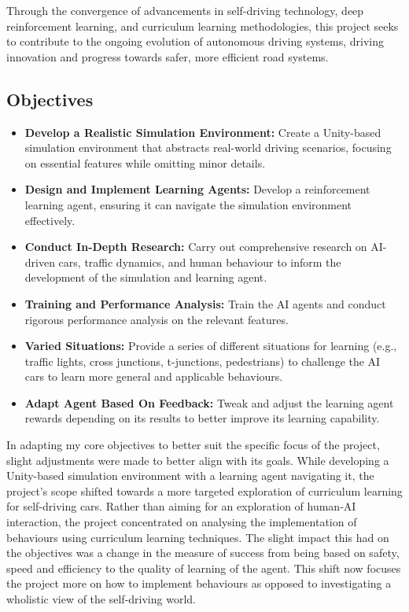 \documentclass{article}
\begin{document}
Through the convergence of advancements in self-driving technology, deep reinforcement learning, and curriculum learning methodologies, this project seeks to contribute to the ongoing evolution of autonomous driving systems, driving innovation and progress towards safer, more efficient road systems.

\subsection{Objectives}
\begin{itemize}
    \item \textbf{Develop a Realistic Simulation Environment:} Create a Unity-based simulation environment that abstracts real-world driving scenarios, focusing on essential features while omitting minor details.
    
    \item \textbf{Design and Implement Learning Agents:} Develop a reinforcement learning agent, ensuring it can navigate the simulation environment effectively.
    
    \item \textbf{Conduct In-Depth Research:} Carry out comprehensive research on AI-driven cars, traffic dynamics, and human behaviour to inform the development of the simulation and learning agent.
    
    \item \textbf{Training and Performance Analysis:} Train the AI agents and conduct rigorous performance analysis on the relevant features.
    
    \item \textbf{Varied Situations:} Provide a series of different situations for learning (e.g., traffic lights, cross junctions, t-junctions, pedestrians) to challenge the AI cars to learn more general and applicable behaviours.
    
    \item \textbf{Adapt Agent Based On Feedback:} Tweak and adjust the learning agent rewards depending on its results to better improve its learning capability.
    
\end{itemize}

In adapting my core objectives to better suit the specific focus of the project, slight adjustments were made to better align with its goals. While developing a Unity-based simulation environment with a learning agent navigating it, the project's scope shifted towards a more targeted exploration of curriculum learning for self-driving cars. Rather than aiming for an exploration of human-AI interaction, the project concentrated on analysing the implementation of behaviours using curriculum learning techniques. The slight impact this had on the objectives was a change in the measure of success from being based on safety, speed and efficiency to the quality of learning of the agent. This shift now focuses the project more on how to implement behaviours as opposed to investigating a wholistic view of the self-driving world.
\end{document}
